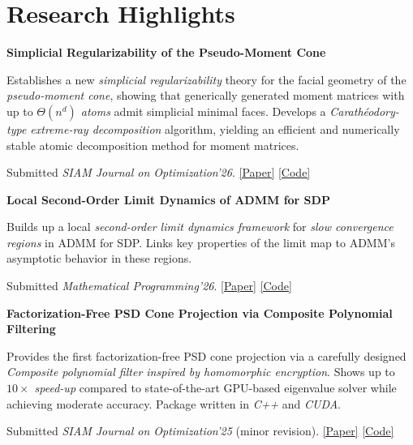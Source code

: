 
    \section{\mysidestyle Research Highlights}

    \textbf{Simplicial Regularizability of the Pseudo-Moment Cone}

    \vquad Establishes a new \emph{simplicial regularizability} theory for the facial geometry of the \emph{pseudo-moment cone}, showing that generically generated moment matrices with up to \emph{$\Theta(n^d)$ atoms} admit simplicial minimal faces. Develops a \emph{Carath\'eodory-type extreme-ray decomposition} algorithm, yielding an efficient and numerically stable atomic decomposition method for moment matrices.
        
    \vquad Submitted \textit{SIAM Journal on Optimization'26}.
    \href{https://arxiv.org/pdf/2605.06854}{[Paper]}
    \href{https://github.com/ComputationalRobotics/momentcone-simregularity}{[Code]}

    \textbf{Local Second-Order Limit Dynamics of ADMM for SDP}

    \vquad Builds up a local \emph{second-order limit dynamics framework} for \emph{slow convergence regions} in ADMM for SDP. Links key properties of the limit map to ADMM's asymptotic behavior in these regions.
        
    \vquad Submitted \textit{Mathematical Programming'26}. 
    \href{https://arxiv.org/pdf/2602.20103}{[Paper]}
    \href{https://github.com/ComputationalRobotics/admmsdp-limitdyn}{[Code]}

    \textbf{Factorization-Free PSD Cone Projection via Composite Polynomial Filtering}

    \vquad Provides the first factorization-free PSD cone projection via a carefully designed \emph{Composite polynomial filter inspired by homomorphic encryption}. Shows up to \emph{$10\times$ speed-up} compared to state-of-the-art GPU-based eigenvalue solver while achieving moderate accuracy. Package written in \emph{C++} and \emph{CUDA}.

    \vquad Submitted \textit{SIAM Journal on Optimization'25} (minor revision). 
    \href{https://arxiv.org/pdf/2507.09165}{[Paper]}
    \href{https://github.com/ComputationalRobotics/psd_projection/tree/main}{[Code]}


